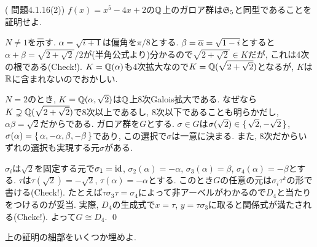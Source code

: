 \begin{prac} (\cite{aoyukie} 問題4.1.16(2))
$f(x) = x^5 - 4x + 2$の$\mathbb{Q}$上のガロア群は$\mathfrak{S}_{5}$と同型であることを証明せよ.
\end{prac}

\begin{egans}
$N\neq 1$を示す. $\alpha = \sqrt{i+1}$は偏角を$\pi/8$とする. $\beta = \overline{\alpha} = \sqrt{1-i}$とすると$\alpha + \beta = \sqrt{2+\sqrt{2}}/2$が(半角公式より)分かるので$\sqrt{2+\sqrt{2}}\in K$だが, これは4次の根である(Check!). $K=\mathbb{Q}(\alpha)$も4次拡大なので$K=\mathbb{Q}(\sqrt{2+\sqrt{2}})$となるが, $K$は$\mathbb{R}$に含まれないのでおかしい. \par
$N=2$のとき, $K=\mathbb{Q}(\alpha,\sqrt{2})$は$\mathbb{Q}$上8次Galois拡大である. なぜなら$K\supsetneq \mathbb{Q}(\sqrt{2+\sqrt{2}})$で8次以上であるし, 8次以下であることも明らかだし, $\alpha\beta = \sqrt{2}$だからである. ガロア群を$G$とする. $\sigma\in G$は$\sigma(\sqrt{2})\in \set{\sqrt{2},-\sqrt{2}}$, $\sigma(\alpha) = \set{\alpha,-\alpha,\beta,-\beta}$であり, この選択で$\sigma$は一意に決まる. また, 8次だからいずれの選択も実現する元$\sigma$がある. \par
$\sigma_i$は$\sqrt{2}$を固定する元で$\sigma_1=\mathrm{id}$, $\sigma_2(\alpha) = -\alpha$, $\sigma_3(\alpha) = \beta$, $\sigma_4(\alpha) = -\beta$とする. $\tau$は$\tau(\sqrt{2}) = -\sqrt{2}$, $\tau(\alpha) = -\alpha$とする. このとき$G$の任意の元は$\sigma_i \tau^k$の形で書ける(Check!). たとえば$\tau \sigma_3\tau = \sigma_4$によって非アーベルがわかるので$D_4$と当たりをつけるのが妥当. 実際, $D_4$の生成式で$x = \tau$, $y=\tau\sigma_3$に取ると関係式が満たされる(Chekc!). よって$G\cong D_4$. \qed

\end{egans}
\begin{prac}
上の証明の細部をいくつか埋めよ.
\end{prac}

